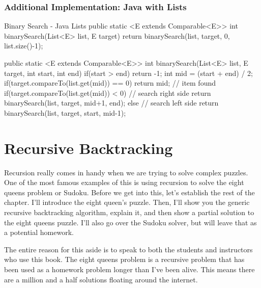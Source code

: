 \subsubsection{Additional Implementation: Java with Lists}
\label{sec:binarySearchJavaP2}


\begin{javacode}[listing and comment,  comment={Performing binary search on a list looks something like this.  Recall that \texttt{Comparable} is an interface that Java uses to let methods and classes know something can be put in order\footnote{Formally, this is a  \textit{total ordering} in fancy math lingo, which means any two items have an established order}.  This necessarily  means that they can be sorted. The generic \texttt{<E extends Comparable<E>>} means the the \texttt{List} of \texttt{E}'s is guaranteed to be made up of items that can be compared to other things of type \texttt{E} to see which comes first.}]{Binary Search - Java Lists}
public static <E extends Comparable<E>> int binarySearch(List<E> list, E target) {
	return binarySearch(list, target, 0, list.size()-1);
}

public static <E extends Comparable<E>> int binarySearch(List<E> list, E target, int start, int end) {
	if(start > end) {
		return -1;
	}
	int mid = (start + end) / 2;
	if(target.compareTo(list.get(mid)) == 0) {
		return mid; // item found
	}
	if(target.compareTo(list.get(mid)) < 0) {
		// search right side
		return binarySearch(list, target, mid+1, end);
	} else {
		// search left side
		return binarySearch(list, target, start, mid-1);
	}
}

\end{javacode}

\section{Recursive Backtracking}
Recursion really comes in handy when we are trying to solve complex puzzles.
One of the most famous examples of this is using recursion to solve the eight queens problem or Sudoku.  Before we get into this, let's establish the rest of the chapter. I'll introduce the eight queen's puzzle.  Then, I'll show you the generic recursive backtracking algorithm, explain it, and then show a partial solution to the eight queens puzzle.  I'll also go over the Sudoku solver, but will leave that as a potential homework.


The entire reason for this aside is to speak to both the students and instructors who use this book.  The eight queens problem is a recursive problem that has been used as a homework problem longer than I've been alive.  This means there are a million and a half solutions floating around the internet.  

